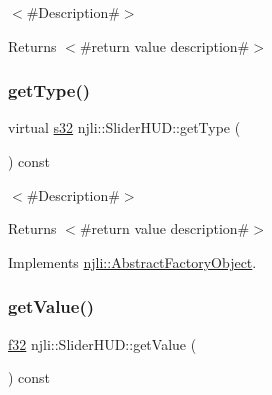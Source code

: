 $<$\#\+Description\#$>$

\begin{DoxyReturn}{Returns}
$<$\#return value description\#$>$ 
\end{DoxyReturn}
\mbox{\label{classnjli_1_1_slider_h_u_d_a6dd59463a9e8b9ea30244b096f8785cc}} 
\subsubsection{\texorpdfstring{get\+Type()}{getType()}}
{\footnotesize\ttfamily virtual \mbox{\hyperlink{_util_8h_aa62c75d314a0d1f37f79c4b73b2292e2}{s32}} njli\+::\+Slider\+H\+U\+D\+::get\+Type (\begin{DoxyParamCaption}{ }\end{DoxyParamCaption}) const\hspace{0.3cm}{\ttfamily [virtual]}}

$<$\#\+Description\#$>$

\begin{DoxyReturn}{Returns}
$<$\#return value description\#$>$ 
\end{DoxyReturn}


Implements \mbox{\hyperlink{classnjli_1_1_abstract_factory_object_a207c86146d40d0794708ae7f2d4e60a7}{njli\+::\+Abstract\+Factory\+Object}}.

\mbox{\label{classnjli_1_1_slider_h_u_d_a1fcb9ca9673e68d68845e450282d1434}} 
\subsubsection{\texorpdfstring{get\+Value()}{getValue()}}
{\footnotesize\ttfamily \mbox{\hyperlink{_util_8h_a5f6906312a689f27d70e9d086649d3fd}{f32}} njli\+::\+Slider\+H\+U\+D\+::get\+Value (\begin{DoxyParamCaption}{ }\end{DoxyParamCaption}) const}

\mbox{\label{classnjli_1_1_slider_h_u_d_a5d7b8b3bc421084f282343e506a6d289}} 
